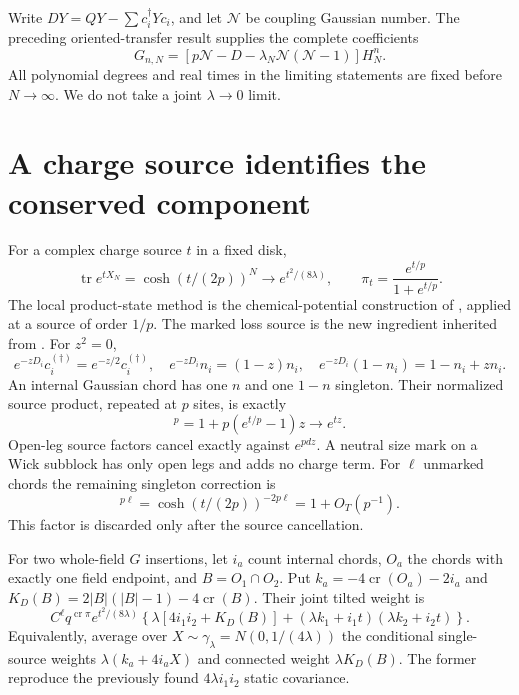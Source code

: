 \documentclass[11pt]{article}
\newcommand{\tr}{\operatorname{tr}}
\newcommand{\NN}{\mathcal N}
\newcommand{\crs}{\operatorname{cr}}
\begin{document}
Write $DY=QY-\sum c_i^\dagger Yc_i$, and let $\NN$ be coupling
Gaussian number. The preceding oriented-transfer result \cite{Body}
supplies the complete coefficients
\begin{equation}
 G_{n,N}=[p\NN-D-\lambda_N\NN(\NN-1)]H_N^n.
\end{equation}
All polynomial degrees and real times in the limiting statements are
fixed before $N\to\infty$. We do not take a joint $\lambda\to0$ limit.

\newpage
\section{A charge source identifies the conserved component}
For a complex charge source $t$ in a fixed disk,
\begin{equation}
 \tr e^{tX_N}=\cosh(t/(2p))^N\longrightarrow e^{t^2/(8\lambda)},
 \qquad \pi_t=\frac{e^{t/p}}{1+e^{t/p}}.
\end{equation}
The local product-state method is the chemical-potential construction
of \cite[Sec.~4.2]{BNR}, applied at a source of order $1/p$.
The marked loss source is the new ingredient inherited from \cite{Body}.
For $z^2=0$,
\begin{equation}
 e^{-zD_i}c_i^{(\dagger)}=e^{-z/2}c_i^{(\dagger)},\quad
 e^{-zD_i}n_i=(1-z)n_i,\quad
 e^{-zD_i}(1-n_i)=1-n_i+zn_i.
\end{equation}
An internal Gaussian chord has one $n$ and one $1-n$ singleton.
Their normalized source product, repeated at $p$ sites, is exactly
\begin{equation}
 [1+(e^{t/p}-1)z]^p=1+p(e^{t/p}-1)z\longrightarrow e^{tz}.
\end{equation}
Open-leg source factors cancel exactly against $e^{pdz}$. A neutral
size mark on a Wick subblock has only open legs and adds no charge term.
For $\ell$ unmarked chords the remaining singleton correction is
\begin{equation}
 [4\pi_t(1-\pi_t)]^{p\ell}
 =\cosh(t/(2p))^{-2p\ell}=1+O_T(p^{-1}).
\end{equation}
This factor is discarded only after the source cancellation.

For two whole-field $G$ insertions, let $i_a$ count internal chords,
$O_a$ the chords with exactly one field endpoint, and $B=O_1\cap O_2$.
Put $k_a=-4\crs(O_a)-2i_a$ and
$K_D(B)=2|B|(|B|-1)-4\crs(B)$. Their joint tilted weight is
\begin{equation}
 C^\ell q^{\crs\pi}e^{t^2/(8\lambda)}
 \left\{\lambda[4i_1i_2+K_D(B)]
       +(\lambda k_1+i_1t)(\lambda k_2+i_2t)\right\}.\label{eq:tilt}
\end{equation}
Equivalently, average over $X\sim\gamma_\lambda=N(0,1/(4\lambda))$
the conditional single-source weights $\lambda(k_a+4i_aX)$ and
connected weight $\lambda K_D(B)$. The former reproduce the previously
found $4\lambda i_1i_2$ static covariance.
\end{document}
